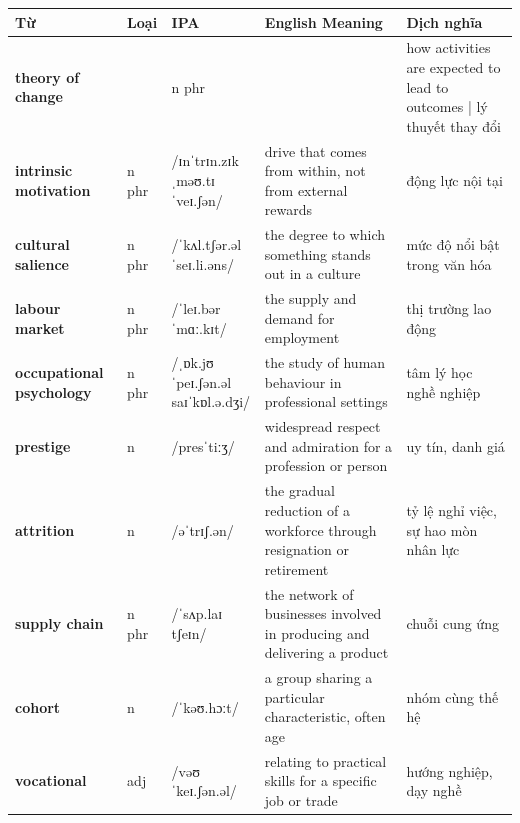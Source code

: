 \separator


\vspace{0.8em}
\begin{center}
\renewcommand{\arraystretch}{1.65}
\begin{tabularx}{\textwidth}{|V{0.22\textwidth}|C{0.07\textwidth}|I{0.20\textwidth}|Y|V{0.18\textwidth}|}
\hline
{}
\textbf{Từ} & \textbf{Loại} & \textbf{IPA} & \textbf{English Meaning} & \textbf{Dịch nghĩa} \\
\hline
\textbf{theory of change} & & n phr & & how activities are expected to lead to outcomes | lý thuyết thay đổi \\ \hline
\textbf{intrinsic motivation} & n phr & /ɪnˈtrɪn.zɪk ˌməʊ.tɪˈveɪ.ʃən/ & drive that comes from within, not from external rewards & động lực nội tại \\ \hline
\textbf{cultural salience} & n phr & /ˈkʌl.tʃər.əl ˈseɪ.li.əns/ & the degree to which something stands out in a culture & mức độ nổi bật trong văn hóa \\ \hline
\textbf{labour market} & n phr & /ˈleɪ.bər ˈmɑː.kɪt/ & the supply and demand for employment & thị trường lao động \\ \hline
\textbf{occupational psychology} & n phr & /ˌɒk.jʊˈpeɪ.ʃən.əl saɪˈkɒl.ə.dʒi/ & the study of human behaviour in professional settings & tâm lý học nghề nghiệp \\ \hline
\textbf{prestige} & n & /presˈtiːʒ/ & widespread respect and admiration for a profession or person & uy tín, danh giá \\ \hline
\textbf{attrition} & n & /əˈtrɪʃ.ən/ & the gradual reduction of a workforce through resignation or retirement & tỷ lệ nghỉ việc, sự hao mòn nhân lực \\ \hline
\textbf{supply chain} & n phr & /ˈsʌp.laɪ tʃeɪn/ & the network of businesses involved in producing and delivering a product & chuỗi cung ứng \\ \hline
\textbf{cohort} & n & /ˈkəʊ.hɔːt/ & a group sharing a particular characteristic, often age & nhóm cùng thế hệ \\ \hline
\textbf{vocational} & adj & /vəʊˈkeɪ.ʃən.əl/ & relating to practical skills for a specific job or trade & hướng nghiệp, dạy nghề \\ \hline
\end{tabularx}
\end{center}

\newpage

